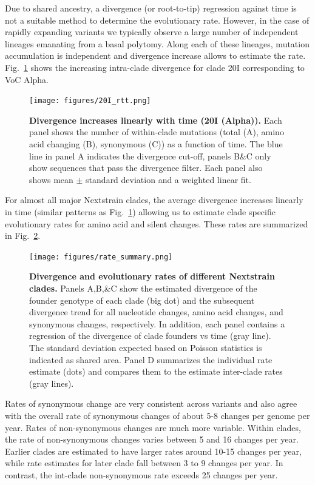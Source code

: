 \documentclass[aps,rmp, twocolumn]{revtex4}
\begin{document}
Due to shared ancestry, a divergence (or root-to-tip) regression against time is not a suitable method to determine the evolutionary rate.
However, in the case of rapidly expanding variants we typically observe a large number of independent lineages emanating from a basal polytomy.
Along each of these lineages, mutation accumulation is independent and divergence increase allows to estimate the rate.
Fig.~\ref{fig:rate_alpha} shows the increasing intra-clade divergence for clade 20I corresponding to VoC Alpha.

\begin{figure}[tb]
    \texttt{[image: figures/20I\_rtt.png]}
    \caption{{\bf Divergence increases linearly with time (20I (Alpha)).} Each panel shows the number of within-clade mutations (total (A), amino acid changing (B), synonymous (C)) as a function of time.
    The blue line in panel A indicates the divergence cut-off, panels B\&C only show sequences that pass the divergence filter. Each panel also shows mean $\pm$ standard deviation and a weighted linear fit.
    \label{fig:rate_alpha}}
\end{figure}

For almost all major Nextstrain clades, the average divergence increases linearly in time (similar patterns as Fig.~\ref{fig:rate_alpha}) allowing us to estimate clade specific evolutionary rates for amino acid and silent changes.
These rates are summarized in Fig.~\ref{fig:rate_summary}.

\begin{figure}
    \texttt{[image: figures/rate\_summary.png]}
    \caption[]{{\bf Divergence and evolutionary rates of different Nextstrain clades.} Panels A,B,\&C show the estimated divergence of the founder genotype of each clade (big dot) and the subsequent divergence trend for all nucleotide changes, amino acid changes, and synonymous changes, respectively. In addition, each panel contains a regression of the divergence of clade founders vs time (gray line).
    The standard deviation expected based on Poisson statistics is indicated as shared area.
    Panel D summarizes the individual rate estimate (dots) and compares them to the estimate inter-clade rates (gray lines).
    \label{fig:rate_summary} }
\end{figure}

Rates of synonymous change are very consistent across variants and also agree with the overall rate of synonymous changes of about 5-8 changes per genome per year.
Rates of non-synonymous changes are much more variable.
Within clades, the rate of non-synonymous changes varies between 5 and 16 changes per year.
Earlier clades are estimated to have larger rates around 10-15 changes per year, while rate estimates for later clade fall  between 3 to 9 changes per year.
In contrast, the int-clade non-synonymous rate exceeds 25 changes per year.
\end{document}
